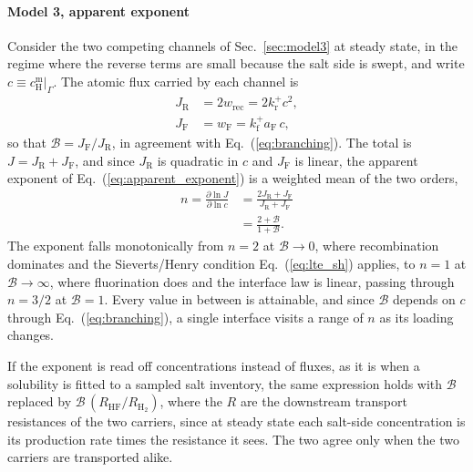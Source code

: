 \documentclass[5p]{elsarticle}
\newcommand{\cm}[1]{c^{\mathrm{m}}_{#1}}   %
\newcommand{\Bra}{\mathcal{B}}             %
\begin{document}
\paragraph{Model 3, apparent exponent} Consider the two competing channels of Sec.~\ref{sec:model3} at steady state, in the regime where the reverse terms are small because the salt side is swept, and write $c \equiv \cm{\mathrm{H}}|_\Gamma$.
The atomic flux carried by each channel is
\begin{equation}
    \begin{aligned}
        J_\mathrm{R} &= 2 w_\mathrm{rec} = 2 k_\mathrm{r}^{+} c^{2} , \\[3pt]
        J_\mathrm{F} &= w_\mathrm{F} = k_\mathrm{f}^{+} a_\mathrm{F}\, c ,
    \end{aligned}
    \label{eq:channel_fluxes}
\end{equation}
so that $\Bra = J_\mathrm{F}/J_\mathrm{R}$, in agreement with Eq.~(\ref{eq:branching}).
The total is $J = J_\mathrm{R} + J_\mathrm{F}$, and since $J_\mathrm{R}$ is quadratic in $c$ and $J_\mathrm{F}$ is linear, the apparent exponent of Eq.~(\ref{eq:apparent_exponent}) is a weighted mean of the two orders,
\begin{equation}
    \begin{aligned}
        n = \frac{\partial \ln J}{\partial \ln c}
          &= \frac{2 J_\mathrm{R} + J_\mathrm{F}}{J_\mathrm{R} + J_\mathrm{F}} \\[3pt]
          &= \frac{2 + \Bra}{1 + \Bra} .
    \end{aligned}
    \label{eq:n_of_B}
\end{equation}
The exponent falls monotonically from $n = 2$ at $\Bra \rightarrow 0$, where recombination dominates and the Sieverts/Henry condition Eq.~(\ref{eq:lte_sh}) applies, to $n = 1$ at $\Bra \rightarrow \infty$, where fluorination does and the interface law is linear, passing through $n = 3/2$ at $\Bra = 1$.
Every value in between is attainable, and since $\Bra$ depends on $c$ through Eq.~(\ref{eq:branching}), a single interface visits a range of $n$ as its loading changes.

If the exponent is read off concentrations instead of fluxes, as it is when a solubility is fitted to a sampled salt inventory, the same expression holds with $\Bra$ replaced by $\Bra\,(R_\mathrm{HF}/R_\mathrm{H_2})$, where the $R$ are the downstream transport resistances of the two carriers, since at steady state each salt-side concentration is its production rate times the resistance it sees.
The two agree only when the two carriers are transported alike.
\end{document}
